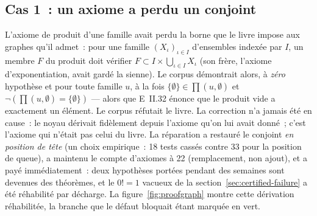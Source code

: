 \documentclass[11pt]{article}
\theoremstyle{remark}\newtheorem{example}{Exemple}
\begin{document}
\subsection{Cas 1~: un axiome a perdu un conjoint}
L'axiome de produit d'une famille avait perdu la borne que le livre impose aux graphes
qu'il admet~: pour une famille $(X_\iota)_{\iota \in I}$ d'ensembles indexée par $I$,
un membre $F$ du produit doit vérifier
$F \subset I \times \bigcup_{\iota \in I} X_\iota$ (son frère, l'axiome
d'exponentiation, avait gardé la sienne). Le corpus démontrait alors, à \emph{zéro}
hypothèse et pour toute famille $u$, à la fois
$\{\emptyset\} \in \prod(u,\emptyset)$ et
$\neg(\prod(u,\emptyset) = \{\emptyset\})$ --- alors que E~II.32 énonce que le produit
vide a exactement un élément. Le corpus réfutait le livre. La correction n'a jamais été
en cause~: le noyau dérivait fidèlement depuis l'axiome qu'on lui avait donné~; c'est
l'axiome qui n'était pas celui du livre. La réparation a restauré le conjoint \emph{en
position de tête} (un choix empirique~: 18 tests cassés contre 33 pour la position de
queue), a maintenu le compte d'axiomes à 22 (remplacement, non ajout), et a payé
immédiatement~: deux hypothèses portées pendant des semaines sont devenues des
théorèmes, et le $0! = 1$ vacueux de la section~\ref{sec:certified-failure} a été
réhabilité par décharge.
La figure~\ref{fig:proofgraph} montre cette dérivation réhabilitée, la branche
que le défaut bloquait étant marquée en vert.
\end{document}
